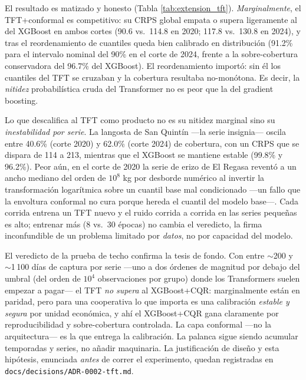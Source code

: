 El resultado es matizado y honesto (Tabla \ref{tab:extension_tft}). \emph{Marginalmente}, el TFT+conformal es competitivo: su CRPS global empata o supera ligeramente al del XGBoost en ambos cortes (90.6 vs.\ 114.8 en 2020; 117.8 vs.\ 130.8 en 2024), y tras el reordenamiento de cuantiles queda bien calibrado en distribución (91.2\% para el intervalo nominal del 90\% en el corte de 2024, frente a la sobre-cobertura conservadora del 96.7\% del XGBoost). El reordenamiento importó: sin él los cuantiles del TFT se cruzaban y la cobertura resultaba no-monótona. Es decir, la \emph{nitidez} probabilística cruda del Transformer no es peor que la del gradient boosting.

Lo que descalifica al TFT como producto no es su nitidez marginal sino su \emph{inestabilidad por serie}. La langosta de San Quintín ---la serie insignia--- oscila entre 40.6\% (corte 2020) y 62.0\% (corte 2024) de cobertura, con un CRPS que se dispara de 114 a 213, mientras que el XGBoost se mantiene estable (99.8\% y 96.2\%). Peor aún, en el corte de 2020 la serie de erizo de El Regasa reventó a un ancho mediano del orden de $10^{8}$ kg por desborde numérico al invertir la transformación logarítmica sobre un cuantil base mal condicionado ---un fallo que la envoltura conformal no cura porque hereda el cuantil del modelo base---. Cada corrida entrena un TFT nuevo y el ruido corrida a corrida en las series pequeñas es alto; entrenar más (8 vs.\ 30 épocas) no cambia el veredicto, la firma inconfundible de un problema limitado por \emph{datos}, no por capacidad del modelo.

El veredicto de la prueba de techo confirma la tesis de fondo. Con entre $\sim$200 y $\sim$1\,100 días de captura por serie ---uno a dos órdenes de magnitud por debajo del umbral (del orden de $10^{4}$ observaciones por grupo) donde los Transformers suelen empezar a pagar--- el TFT \emph{no supera} al XGBoost+CQR: marginalmente están en paridad, pero para una cooperativa lo que importa es una calibración \emph{estable y segura} por unidad económica, y ahí el XGBoost+CQR gana claramente por reproducibilidad y sobre-cobertura controlada. La capa conformal ---no la arquitectura--- es la que entrega la calibración. La palanca sigue siendo acumular temporadas y series, no añadir maquinaria. La justificación de diseño y esta hipótesis, enunciada \emph{antes} de correr el experimento, quedan registradas en \texttt{docs/decisions/ADR-0002-tft.md}.
